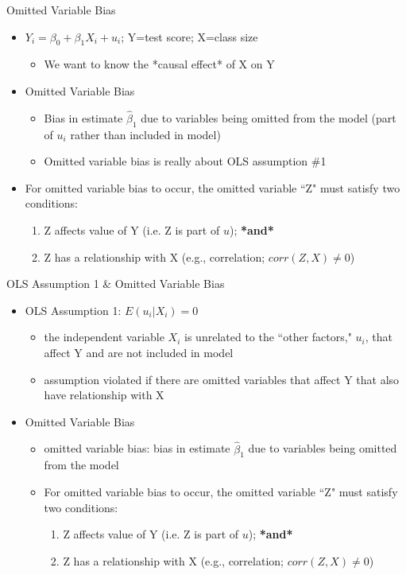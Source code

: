 \begin{frame}{Omitted Variable Bias}
	\begin{itemize}
	\item $Y_{i} = \beta_{0} + \beta_{1}X_{i} + u_{i}$; Y=test score; X=class size
		\begin{itemize}
		\item We want to know the *causal effect* of X on Y
		\end{itemize}
	\item Omitted Variable Bias
		\begin{itemize}
		\item Bias in estimate $\hat{\beta}_{1}$ due to variables being omitted from the model (part of $u_i$ rather than included in model)
		\item Omitted variable bias is really about OLS assumption \#1
		\end{itemize}
	\vspace{3mm}	
	\item For omitted variable bias to occur, the omitted variable ``Z" must satisfy two conditions:
		\begin{enumerate}
		\item Z affects value of Y (i.e. Z is part of $u$); \textbf{*and*}
		\item Z has a relationship with X (e.g., correlation; $corr(Z,X) \neq 0$)
		\end{enumerate}
	\end{itemize}
\end{frame}




\begin{frame}{OLS Assumption 1 \& Omitted Variable Bias}
	\begin{itemize}
	\item OLS Assumption 1: $E(u_{i}|X_{i}) = 0$
		\begin{itemize}
		\item the independent variable $X_{i}$ is unrelated to the ``other factors," $u_{i}$, that affect Y and are not included in model
		\item assumption violated if there are omitted variables that affect Y that also have relationship with X
		\end{itemize}
	\item Omitted Variable Bias
		\begin{itemize}
		\item omitted variable bias: bias in estimate $\hat{\beta}_{1}$ due to variables being omitted from the model
		\item For omitted variable bias to occur, the omitted variable ``Z" must satisfy two conditions:
			\begin{enumerate}
			\item Z affects value of Y (i.e. Z is part of $u$); \textbf{*and*}
			\item Z has a relationship with X (e.g., correlation; $corr(Z,X) \neq 0$)
			\end{enumerate}
		\end{itemize}
	\end{itemize}
\end{frame}


